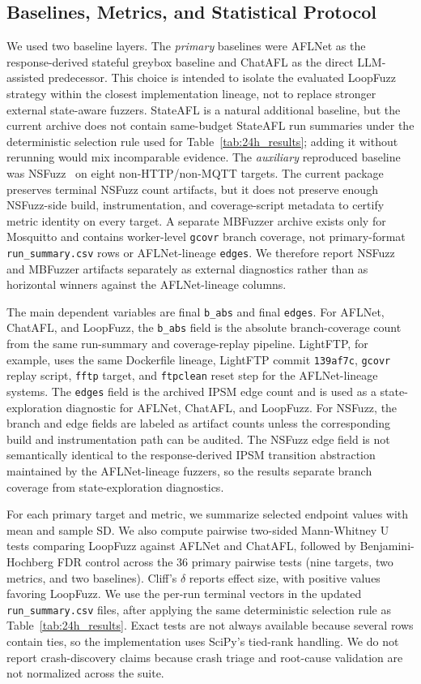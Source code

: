 \documentclass[final,5p,times,number]{elsarticle}
\begin{document}
\subsection{Baselines, Metrics, and Statistical Protocol}
We used two baseline layers. The \emph{primary} baselines were AFLNet as the response-derived stateful greybox baseline and ChatAFL as the direct LLM-assisted predecessor. This choice is intended to isolate the evaluated LoopFuzz strategy within the closest implementation lineage, not to replace stronger external state-aware fuzzers. StateAFL is a natural additional baseline, but the current archive does not contain same-budget StateAFL run summaries under the deterministic selection rule used for Table~\ref{tab:24h_results}; adding it without rerunning would mix incomparable evidence. The \emph{auxiliary} reproduced baseline was NSFuzz~\cite{nsfuzz} on eight non-HTTP/non-MQTT targets. The current package preserves terminal NSFuzz count artifacts, but it does not preserve enough NSFuzz-side build, instrumentation, and coverage-script metadata to certify metric identity on every target. A separate MBFuzzer archive exists only for Mosquitto and contains worker-level \texttt{gcovr} branch coverage, not primary-format \texttt{run\_summary.csv} rows or AFLNet-lineage \texttt{edges}. We therefore report NSFuzz and MBFuzzer artifacts separately as external diagnostics rather than as horizontal winners against the AFLNet-lineage columns.

The main dependent variables are final \texttt{b\_abs} and final \texttt{edges}. For AFLNet, ChatAFL, and LoopFuzz, the \texttt{b\_abs} field is the absolute branch-coverage count from the same run-summary and coverage-replay pipeline. LightFTP, for example, uses the same Dockerfile lineage, LightFTP commit \texttt{139af7c}, \texttt{gcovr} replay script, \texttt{fftp} target, and \texttt{ftpclean} reset step for the AFLNet-lineage systems. The \texttt{edges} field is the archived IPSM edge count and is used as a state-exploration diagnostic for AFLNet, ChatAFL, and LoopFuzz. For NSFuzz, the branch and edge fields are labeled as artifact counts unless the corresponding build and instrumentation path can be audited. The NSFuzz edge field is not semantically identical to the response-derived IPSM transition abstraction maintained by the AFLNet-lineage fuzzers, so the results separate branch coverage from state-exploration diagnostics.

For each primary target and metric, we summarize selected endpoint values with mean and sample SD. We also compute pairwise two-sided Mann-Whitney U tests comparing LoopFuzz against AFLNet and ChatAFL, followed by Benjamini-Hochberg FDR control across the 36 primary pairwise tests (nine targets, two metrics, and two baselines). Cliff's $\delta$ reports effect size, with positive values favoring LoopFuzz. We use the per-run terminal vectors in the updated \texttt{run\_summary.csv} files, after applying the same deterministic selection rule as Table~\ref{tab:24h_results}. Exact tests are not always available because several rows contain ties, so the implementation uses SciPy's tied-rank handling. We do not report crash-discovery claims because crash triage and root-cause validation are not normalized across the suite.
\end{document}
